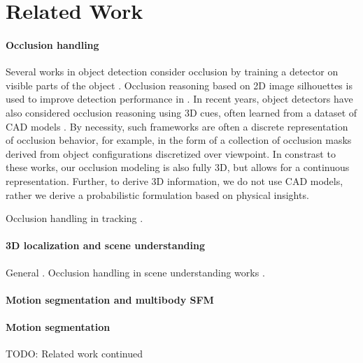 \section{Related Work}
\label{sec:related}


\paragraph{Occlusion handling}
Several works in object detection consider occlusion by training a detector on visible parts of the object \cite{Gao_etal_2011,Wu_Nevatia_2007}. Occlusion reasoning based on 2D image silhouettes is used to improve detection performance in \cite{Hsiao_Herbert_2012}.  In recent years, object detectors have also considered occlusion reasoning using 3D cues, often learned from a dataset of CAD models \cite{Pepik_etal_2012,Pepik_etal_2013,Xiang_Savarese_2013}. By necessity, such frameworks are often a discrete representation of occlusion behavior, for example, in the form of a collection of occlusion masks derived from object configurations discretized over viewpoint. In constrast to these works, our occlusion modeling is also fully 3D, but allows for a continuous representation. Further, to derive 3D information, we do not use CAD models, rather we derive a probabilistic formulation based on physical insights.


Occlusion handling in tracking \cite{Kwak_etal_2012,Wu_Nevatia_2007,Milan_etal_2014}.


\paragraph{3D localization and scene understanding}
General \cite{Geiger2011, Geiger_etal_2014}.
Occlusion handling in scene understanding works \cite{Wojek_etal_2013,Zia_etal_2013,Zia_etal_2014}.


\paragraph{Motion segmentation and multibody SFM}
\cite{Tron_Vidal_2007}
\cite{Rao_etal_2010}
\cite{Brox_Malik_2010}


\cite{Schindler2006}
\cite{Ozden_etal_2010}
\cite{Namdev2012}
\cite{Kundu_etal_2011}



\paragraph{Motion segmentation}






TODO:
\vfill
\pagebreak
Related work continued
\vspace{15cm}

